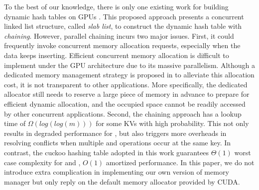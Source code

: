 To the best of our knowledge, there is only one existing work for building dynamic hash tables on GPUs \cite{ashkiani2018dynamic}.
This proposed approach presents a concurrent linked list structure, called \emph{slab list}, to construct the dynamic hash table with \emph{chaining}. 
However, parallel chaining incurs two major issues. 
First, it could frequently invoke concurrent memory allocation requests, especially when the data keeps inserting. Efficient concurrent memory allocation is difficult to implement under the GPU architecture due to its massive parallelism. Although a dedicated memory management strategy is proposed in \cite{ashkiani2018dynamic} to alleviate this allocation cost, it is not transparent to other applications. More specifically, the dedicated allocator still needs to reserve a large piece of memory in advance to prepare for efficient dynamic allocation, and the occupied space cannot be readily accessed by other concurrent applications. 
Second, the chaining approach has a lookup time of $\Omega(log(log(m)))$ for some KVs with high probability. This not only results in degraded performance for , but also triggers more overheads in resolving conflicts when multiple  and  operations occur at the same key.
In contrast, the cuckoo hashing table adopted in this work guarantees $\Theta(1)$ worst case complexity for  and , 
$O(1)$ amortized  performance. In this paper, we do not introduce extra complication in implementing our own version of memory manager but only reply on the default memory allocator provided by CUDA. 